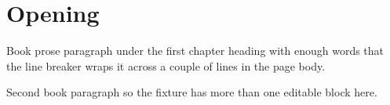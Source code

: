 \documentclass{book}
\begin{document}
\chapter{Opening}

Book prose paragraph under the first chapter heading with enough words that the
line breaker wraps it across a couple of lines in the page body.

Second book paragraph so the fixture has more than one editable block here.
\end{document}
